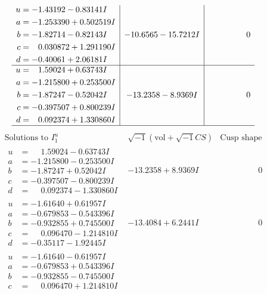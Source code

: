 \documentclass[1p]{elsarticle_modified}
\theoremstyle{definition}
\newcommand{\I}{\sqrt{-1}}
\begin{document}
$$\begin{array}{c|c|c}
\begin{aligned}
u &= -1.43192 - 0.83141 I \\
a &= -1.253390 + 0.502519 I \\
b &= -1.82714 - 0.82143 I \\
c &= \phantom{-}0.030872 + 1.291190 I \\
d &= -0.40061 + 2.06181 I\end{aligned}
 & -10.6565 - 15.7212 I & \phantom{-0.000000 } 0 \\ \hline\begin{aligned}
u &= \phantom{-}1.59024 + 0.63743 I \\
a &= -1.215800 + 0.253500 I \\
b &= -1.87247 - 0.52042 I \\
c &= -0.397507 + 0.800239 I \\
d &= \phantom{-}0.092374 + 1.330860 I\end{aligned}
 & -13.2358 - 8.9369 I & \phantom{-0.000000 } 0\\
 \hline 
 \end{array}$$\newpage$$\begin{array}{c|c|c}  
\text{Solutions to }I^u_{1}& \I (\text{vol} + \sqrt{-1}CS) & \text{Cusp shape}\\
 \hline 
\begin{aligned}
u &= \phantom{-}1.59024 - 0.63743 I \\
a &= -1.215800 - 0.253500 I \\
b &= -1.87247 + 0.52042 I \\
c &= -0.397507 - 0.800239 I \\
d &= \phantom{-}0.092374 - 1.330860 I\end{aligned}
 & -13.2358 + 8.9369 I & \phantom{-0.000000 } 0 \\ \hline\begin{aligned}
u &= -1.61640 + 0.61957 I \\
a &= -0.679853 - 0.543396 I \\
b &= -0.932855 + 0.745500 I \\
c &= \phantom{-}0.096470 - 1.214810 I \\
d &= -0.35117 - 1.92445 I\end{aligned}
 & -13.4084 + 6.2441 I & \phantom{-0.000000 } 0 \\ \hline\begin{aligned}
u &= -1.61640 - 0.61957 I \\
a &= -0.679853 + 0.543396 I \\
b &= -0.932855 - 0.745500 I \\
c &= \phantom{-}0.096470 + 1.214810 I \\

\end{aligned}
\end{array}$$
\end{document}
